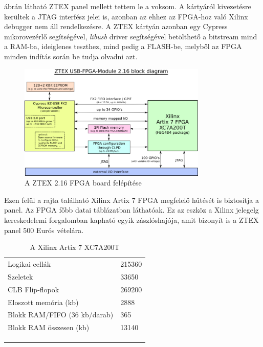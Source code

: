  ábrán látható ZTEX panel mellett tettem le a voksom. A kártyáról kivezetésre kerültek a JTAG interfész jelei is, azonban az ehhez az FPGA-hoz való Xilinx debugger nem áll rendelkezésre. A ZTEX kártyán azonban egy Cypress mikorovezérlő segítségével, \emph{libusb} driver segítségével betölthető a bitstream mind a RAM-ba, ideiglenes teszthez, mind pedig a FLASH-be, melyből az FPGA minden indítás során be tudja olvadni azt.


\begin{figure}[!ht]
	\centering
	\includegraphics[width = 0.8\textwidth]{figures/usb-fpga-216.png}
	\caption{A ZTEX 2.16 FPGA board felépítése} 
	\label{fig:ztex_block}
\end{figure}


Ezen felül a rajta található Xilinx Artix 7 FPGA megfelelő hűtését is biztosítja a panel. Az FPGA főbb datai  táblázatban láthatóak. Ez az eszköz a Xilinx jelegelg kereskedelemi forgalomban kapható egyik zászlóshajója, amit bizonyít is a ZTEX panel 500 Eurós vételára.

\begin{table}[]
\centering
\begin{tabular}{ll}
Logikai cellák               & 215360 \\
Szeletek                     & 33650  \\
CLB Flip-flopok              & 269200 \\
Eloszott memória (kb)        & 2888   \\
Blokk RAM/FIFO (36 kb/darab) & 365    \\
Blokk RAM összesen (kb)      & 13140  \\
                             &        \\
                             &        \\
                             & 
  
\end{tabular}
\caption{A Xilinx Artix 7 XC7A200T}
\label{artix7spec}    
\end{table}

